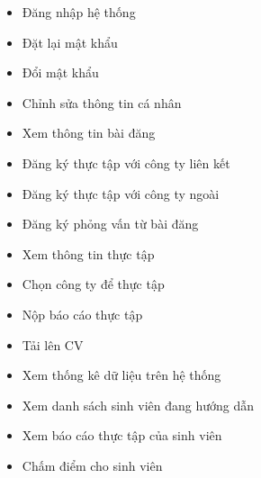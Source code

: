 \documentclass[./../main.tex]{subfiles}
\begin{document}
\begin{itemize}
	\item

	      Đăng nhập hệ thống

	\item

	      Đặt lại mật khẩu

	\item

	      Đổi mật khẩu

	\item

	      Chỉnh sửa thông tin cá nhân

	\item

	      Xem thông tin bài đăng

	\item

	      Đăng ký thực tập với công ty liên kết

	\item

	      Đăng ký thực tập với công ty ngoài

	\item

	      Đăng ký phỏng vấn từ bài đăng

	\item

	      Xem thông tin thực tập

	\item

	      Chọn công ty để thực tập

	\item

	      Nộp báo cáo thực tập

	\item

	      Tải lên CV

	\item

	      Xem thống kê dữ liệu trên hệ thống

	\item

	      Xem danh sách sinh viên đang hướng dẫn

	\item

	      Xem báo cáo thực tập của sinh viên

	\item

	      Chấm điểm cho sinh viên
\end{itemize}
\end{document}
